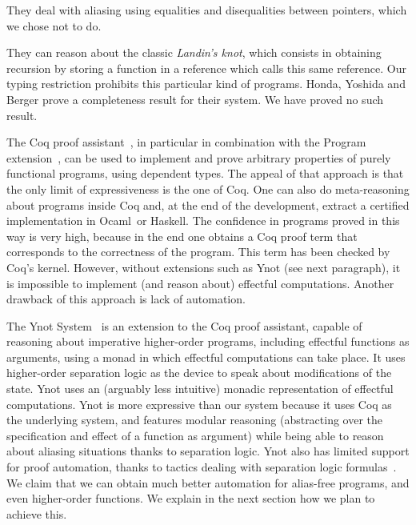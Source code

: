 \documentclass[a4paper]{llncs}
\newcommand{\ocaml}{Ocaml}
\begin{document}
They deal with aliasing using equalities and disequalities between
pointers, which we chose not to do. 

They can reason about the classic {\em
Landin's knot}, which consists in obtaining recursion by storing a function in
a reference which calls this same reference. Our typing restriction prohibits
this particular kind of programs.  Honda, Yoshida and Berger prove a
completeness result for their system. We have proved no such result.


The Coq proof assistant~\cite{CoqManualV81}, in particular in combination with
the Program extension~\cite{sozeau07icfp}, can be used to implement and prove
arbitrary properties of purely functional programs, using dependent types. The
appeal of that approach is that the only limit of expressiveness is the one of
Coq. One can also do meta-reasoning about programs inside Coq and, at the end
of the development, extract a certified implementation in \ocaml\ or Haskell.
The confidence in programs proved in this way is very high, because in the end
one obtains a Coq proof term that corresponds to the correctness of the
program. This term has been checked by Coq's kernel. However, without
extensions such as Ynot (see next paragraph), it is impossible to implement
(and reason about) effectful computations. Another drawback of this approach
is lack of automation.

The Ynot System~\cite{Nanevski08Awkward,chlipalaicfp09} is an extension to the
Coq proof assistant, capable of reasoning about imperative higher-order
programs, including effectful functions as arguments, using a monad in which
effectful computations can take place. It uses higher-order separation logic
as the device to speak about modifications of the state. Ynot uses an
(arguably less intuitive) monadic representation of effectful computations.
Ynot is more expressive than our system because it uses Coq as the underlying
system, and features modular reasoning (abstracting over the specification and
effect of a function as argument) while being able to reason about aliasing
situations thanks to separation logic. Ynot also has limited support for
proof automation, thanks to tactics dealing with separation logic
formulas~\cite{chlipalaicfp09}. We claim that we can obtain much better
automation for alias-free programs, and even higher-order functions. We
explain in the next section how we plan to achieve this.
\end{document}
